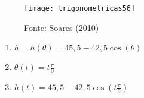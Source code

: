 \documentclass[10 pt,usenames,dvipsnames, oneside]{article}
\begin{document}
\begin{figure}[H]
\centering

\texttt{[image: trigonometricas56]}
\caption{Fonte: Soares (2010)}
\label{}
\end{figure}

\ifdefined\prof
\begin{solucao}

\begin{enumerate}
\item $h=h(\theta)=45{,}5-42{,}5\cos(\theta)$
\item $\theta(t)=t\frac{\pi}{0}$
\item $h(t)=45{,}5-42{,}5\cos(t\frac{\pi}{9})$
\end{enumerate}

\end{solucao}
\fi
\end{document}
